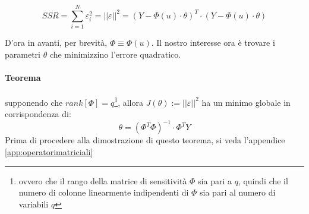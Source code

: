   \[ SSR=\sum_{i=1}^{N}{\varepsilon_i^2 } = {||\varepsilon ||}^2 = (Y-\Phi(u)\cdot \theta)^T \cdot (Y-\Phi(u)\cdot \theta) \]
  
D'ora in avanti, per brevità, $\Phi\equiv \Phi(u)$. Il nostro interesse ora è trovare i parametri $\theta$ che minimizzino l'errore quadratico.
\paragraph{Teorema} supponendo che $rank[\Phi]=q$\footnote{ovvero che il rango della matrice di sensitività $\Phi$ sia pari a $q$, quindi che il numero di colonne linearmente indipendenti di $\Phi$ sia pari al numero di variabili $q$}, allora $ J(\theta):={||\varepsilon ||}^2 $ ha un minimo globale in corrispondenza di:
  \[ \theta=(\Phi^T\Phi)^{-1}\cdot \Phi^TY \]
Prima di procedere alla dimostrazione di questo teorema, si veda l'appendice \ref{app:operatorimatriciali}


